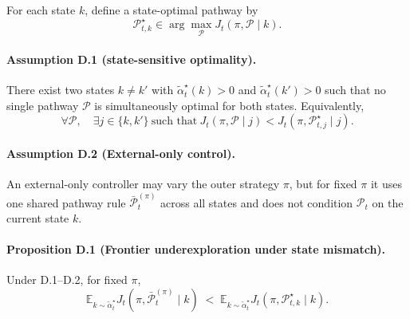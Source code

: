 For each state \(k\), define a state-optimal pathway by
\begin{equation}
\mathcal{P}_{t,k}^{\star}\in\arg\max_{\mathcal{P}}J_t(\pi,\mathcal{P}\mid k).
\label{eq:app_frontier_state_opt}
\end{equation}

\paragraph{Assumption D.1 (state-sensitive optimality).}
There exist two states \(k\neq k'\) with \(\tilde{\alpha}_t^\star(k)>0\) and \(\tilde{\alpha}_t^\star(k')>0\) such that no single pathway \(\mathcal{P}\) is simultaneously optimal for both states. Equivalently,
\[
\forall \mathcal{P},\quad
\exists j\in\{k,k'\}\ \text{such that}\ 
J_t(\pi,\mathcal{P}\mid j)<J_t(\pi,\mathcal{P}_{t,j}^{\star}\mid j).
\]

\paragraph{Assumption D.2 (External-only control).}
An external-only controller may vary the outer strategy \(\pi\), but for fixed \(\pi\) it uses one shared pathway rule \(\bar{\mathcal{P}}_t^{(\pi)}\) across all states and does not condition \(\mathcal{P}_t\) on the current state \(k\).

\paragraph{Proposition D.1 (Frontier underexploration under state mismatch).}
Under D.1--D.2, for fixed \(\pi\),
\begin{equation}
\mathbb{E}_{k\sim \tilde{\alpha}_t^\star}
J_t(\pi,\bar{\mathcal{P}}_t^{(\pi)}\mid k)
\;<\;
\mathbb{E}_{k\sim \tilde{\alpha}_t^\star}
J_t(\pi,\mathcal{P}_{t,k}^{\star}\mid k).
\label{eq:app_frontier_gap}
\end{equation}

